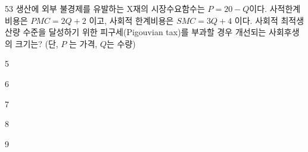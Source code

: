 \begin{question}{53}
생산에 외부 불경제를 유발하는 X재의 시장수요함수는 $P=20-Q$이다. 사적한계비용은 $PMC=2Q+2$ 이고, 사회적 한계비용은 $SMC=3Q+4$ 이다. 사회적 최적생산량 수준을 달성하기 위한 피구세(Pigouvian tax)를 부과할 경우 개선되는 사회후생의 크기는? (단, $P$ 는 가격, $Q$는 수량)
\begin{choices}
  \item 5
  \item 6
  \item 7
  \item 8
  \item 9
\end{choices}
\end{question}
